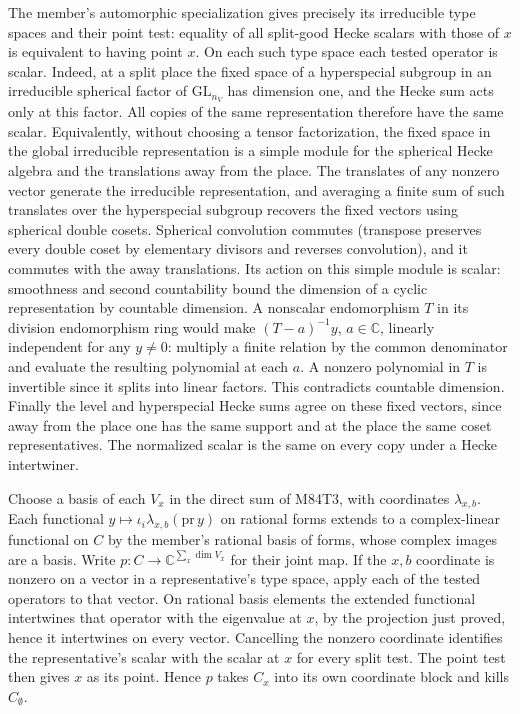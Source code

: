 The member's automorphic specialization gives precisely its
irreducible type spaces and their point test: equality of all
split-good Hecke scalars with those of $x$ is equivalent to
having point $x$. On each such type space each tested operator
is scalar. Indeed, at a split place the fixed space of a
hyperspecial subgroup in an irreducible spherical factor of
$\mathrm{GL}_{n_V}$ has dimension one, and the Hecke sum acts
only at this factor. All copies of the same representation
therefore have the same scalar. Equivalently, without choosing
a tensor factorization, the fixed space in the global
irreducible representation is a simple module for the
spherical Hecke algebra and the translations away from the
place. The translates of any nonzero vector generate the
irreducible representation, and averaging a finite sum of
such translates over the hyperspecial subgroup recovers the
fixed vectors using spherical double cosets. Spherical
convolution commutes (transpose preserves every double coset
by elementary divisors and reverses convolution), and it
commutes with the away translations. Its action on this
simple module is scalar: smoothness and second countability
bound the dimension of a cyclic representation by countable
dimension. A nonscalar endomorphism $T$ in its division
endomorphism ring would make $(T-a)^{-1}y$, $a\in\mathbb C$,
linearly independent for any $y\ne0$: multiply a finite
relation by the common denominator and evaluate the resulting
polynomial at each $a$. A nonzero polynomial in $T$ is
invertible since it splits into linear factors. This contradicts
countable dimension. Finally the level and hyperspecial Hecke
sums agree on these fixed vectors, since away from the place
one has the same support and at the place the same coset
representatives. The normalized scalar is the same on every
copy under a Hecke intertwiner.

Choose a basis of each $V_x$ in the direct sum of M84T3, with
coordinates $\lambda_{x,b}$. Each functional
$y\mapsto\iota_i\lambda_{x,b}(\mathrm{pr}\,y)$ on rational
forms extends to a complex-linear functional on $C$ by the
member's rational basis of forms, whose complex images are a
basis. Write $p:C\to\mathbb C^{\sum_x\dim V_x}$ for their
joint map. If the $x,b$ coordinate is nonzero on a vector
in a representative's type space, apply each of the tested
operators to that vector. On rational basis elements the
extended functional intertwines that operator with the
eigenvalue at $x$, by the projection just proved, hence it
intertwines on every vector. Cancelling the nonzero coordinate
identifies the representative's scalar with the scalar at $x$
for every split test. The point test then gives $x$ as its
point. Hence $p$ takes $C_x$ into its own coordinate block
and kills $C_\emptyset$.

